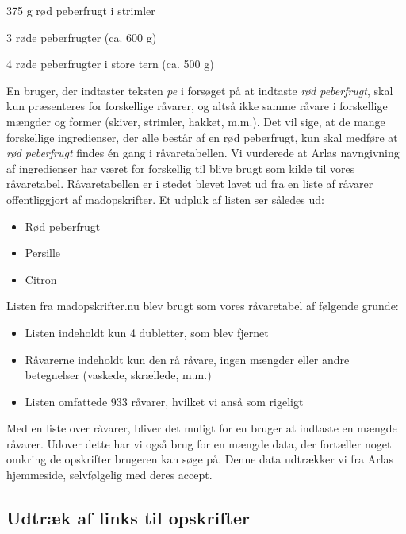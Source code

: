 375 g rød peberfrugt i strimler

3 røde peberfrugter (ca. 600 g)

4 røde peberfrugter i store tern (ca. 500 g)

En bruger, der indtaster teksten \textit{pe} i forsøget på at indtaste \textit{rød peberfrugt}, skal kun præsenteres for forskellige råvarer, og altså ikke samme råvare i forskellige mængder og former (skiver, strimler, hakket, m.m.). Det vil sige, at de mange forskellige ingredienser, der alle består af en rød peberfrugt, kun skal medføre at \textit{rød peberfrugt} findes én gang i råvaretabellen. Vi vurderede at Arlas navngivning af ingredienser har været for forskellig til blive brugt som kilde til vores råvaretabel. Råvaretabellen er i stedet blevet lavet ud fra en liste af råvarer offentliggjort af madopskrifter. Et udpluk af listen ser således ud:

\begin{itemize}
\item Rød peberfrugt
\item Persille
\item Citron
\end{itemize}

Listen fra madopskrifter.nu blev brugt som vores råvaretabel af følgende grunde:

\begin{itemize}
\item Listen indeholdt kun 4 dubletter, som blev fjernet
\item Råvarerne indeholdt kun den rå råvare, ingen mængder eller andre betegnelser (vaskede, skrællede, m.m.)
\item Listen omfattede 933 råvarer, hvilket vi anså som rigeligt
\end{itemize}

Med en liste over råvarer, bliver det muligt for en bruger at indtaste en mængde råvarer. Udover dette har vi også brug for en mængde data, der fortæller noget omkring de opskrifter brugeren kan søge på. Denne data udtrækker vi fra Arlas hjemmeside, selvfølgelig med deres accept.

\subsection{Udtræk af links til opskrifter}

